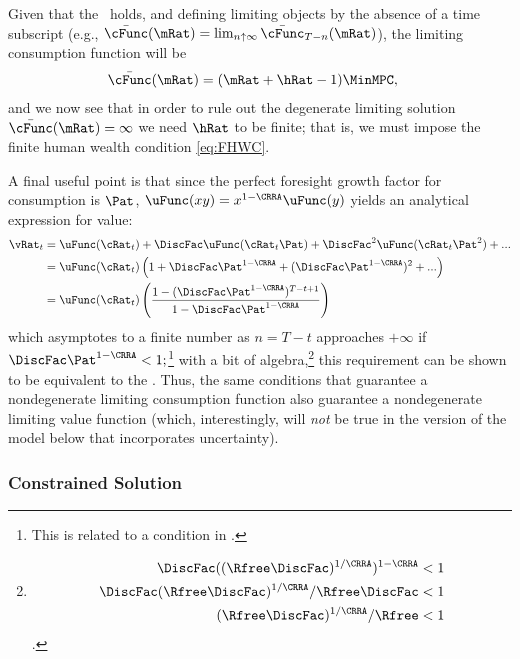 \documentclass[BufferStockTheory]{subfiles}
\begin{document}
Given that the \RIC~holds, and defining limiting objects by the absence of a time subscript (e.g., $\bar{\cFunc}(\mRat)=\lim_{n \uparrow \infty} \bar{\cFunc}_{T-n}(\mRat)$), the limiting consumption function will be
\begin{align}\label{eq:cFuncPFUnc}
  \bar{\cFunc}(\mRat)  & = (\mRat+\hRat-1)\MinMPC, 
\end{align}
and we now see that in order to rule out the degenerate limiting
solution $\bar{\cFunc}(\mRat) = \infty$ we need $\hRat$ to be finite; that is, we
must impose the finite human wealth condition \eqref{eq:FHWC}.

\hypertarget{ValuePFAnalytical}{}
A final useful point is that since the perfect foresight
growth factor for consumption is $\Pat$, $\uFunc(xy) =
x^{1-\CRRA}\uFunc(y)$ yields an analytical expression for value:  
\begin{align}
  \vRat_{t}  & = \uFunc(\cRat_{t})+\DiscFac \uFunc(\cRat_{t}\Pat)+\DiscFac^{2} \uFunc(\cRat_{t} \Pat^{2})+... \label{eq:ValuePFAnalytical}
  \\  & = \uFunc(\cRat_{t})\left(1+\DiscFac \Pat^{1-\CRRA}+(\DiscFac \Pat^{1-\CRRA})^{2}+...\right) \notag 
  \\  & = \uFunc(\cRat_{t})\left(\frac{1-(\DiscFac \Pat^{1-\CRRA})^{T-t+1}}{1-\DiscFac \Pat^{1-\CRRA}}\right) \notag
\end{align}
which asymptotes to a finite number as $n=T-t$ approaches $+\infty$ if $\DiscFac \Pat^{1-\CRRA} < 1;$\footnote{This is related to a condition in \cite{asHomogeneous}.} with a bit of algebra,\footnote{
  \begin{align*}
    \DiscFac ((\Rfree \DiscFac)^{1/\CRRA})^{1-\CRRA}  & < 1
    \\ \DiscFac (\Rfree\DiscFac)^{1/\CRRA}/\Rfree\DiscFac  & < 1
    \\ (\Rfree \DiscFac)^{1/\CRRA} /\Rfree  & < 1
  \end{align*}.
} this requirement can be shown to be equivalent to the {\RIC}.  Thus, the same conditions that guarantee a nondegenerate limiting consumption function also guarantee a nondegenerate limiting value function (which, interestingly, will \textit{not} be true in the version of the model below that incorporates uncertainty).


\hypertarget{Constrained-Solution}{}
\subsubsection{Constrained Solution}
\end{document}
